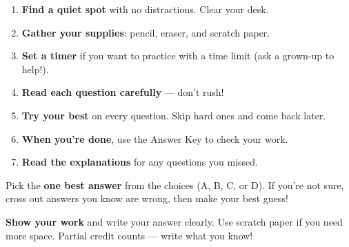 {%
\begin{tcolorbox}[
    enhanced,
    colback=funBlueLight,
    colframe=funBlue!50,
    arc=8pt, boxrule=1pt,
    left=5mm, right=5mm, top=3mm, bottom=3mm,
    title={\textcolor{white}{\faClipboardCheck~How to Take a Practice Test}},
    colbacktitle=funBlue!70,
    fonttitle=\bfseries\sffamily,
]
    \small
    \begin{enumerate}[leftmargin=*, itemsep=3pt]
        \item \textbf{Find a quiet spot} with no distractions. Clear your desk.
        \item \textbf{Gather your supplies}: pencil, eraser, and scratch paper.
        \item \textbf{Set a timer} if you want to practice with a time limit (ask a grown-up
            to help!).
        \item \textbf{Read each question carefully} --- don't rush!
        \item \textbf{Try your best} on every question. Skip hard ones and come back later.
        \item \textbf{When you're done}, use the Answer Key to check your work.
        \item \textbf{Read the explanations} for any questions you missed.
    \end{enumerate}
\end{tcolorbox}

\vspace{2mm}

\begin{minipage}[t]{0.48\textwidth}
\begin{tcolorbox}[
    enhanced,
    colback=funOrangeLight,
    colframe=funOrange!50,
    arc=8pt, boxrule=1pt,
    left=4mm, right=4mm, top=3mm, bottom=3mm,
    title={\textcolor{white}{\faCircle~Multiple Choice}},
    colbacktitle=funOrange!70,
    fonttitle=\bfseries\sffamily,
    height=4.2cm,
    valign=center,
]
    \small Pick the \textbf{one best answer} from the choices (A, B, C, or D). If you're not sure, cross out answers you know are wrong, then make your best guess!
\end{tcolorbox}
\end{minipage}%
\hfill
\begin{minipage}[t]{0.48\textwidth}
\begin{tcolorbox}[
    enhanced,
    colback=funTealLight,
    colframe=funTeal!60,
    arc=8pt, boxrule=1pt,
    left=4mm, right=4mm, top=3mm, bottom=3mm,
    title={\textcolor{white}{\faPen~Short Answer}},
    colbacktitle=funTeal!70,
    fonttitle=\bfseries\sffamily,
    height=4.2cm,
    valign=center,
]
    \small \textbf{Show your work} and write your answer clearly. Use scratch paper if you need more space. Partial credit counts --- write what you know!
\end{tcolorbox}
\end{minipage}

}
